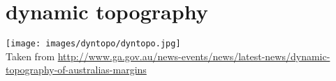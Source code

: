 \section{dynamic topography} 

\begin{center}
\texttt{[image: images/dyntopo/dyntopo.jpg]}\\
{\captionfont Taken from \url{http://www.ga.gov.au/news-events/news/latest-news/dynamic-topography-of-australias-margins}}
\end{center}

